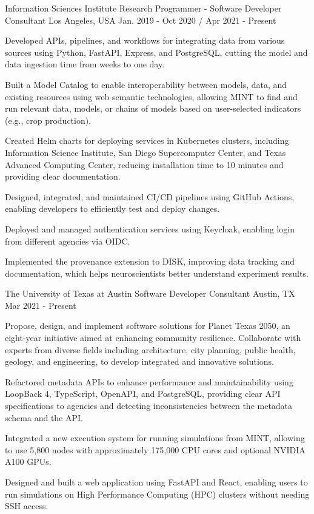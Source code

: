 \begin{cventries}

  \cventry
    {Information Sciences Institute}
    {Research Programmer - Software Developer Consultant}
    {Los Angeles, USA}
    {Jan. 2019 - Oct 2020 / Apr 2021 - Present}
    {
      \begin{cvitems}

        \item{Developed APIs, pipelines, and workflows for integrating data from various sources using Python, FastAPI, Express, and PostgreSQL, cutting the model and data ingestion time from weeks to one day.}
        \item{Built a Model Catalog to enable interoperability between models, data, and existing resources using web semantic technologies, allowing MINT to find and run relevant data, models, or chains of models based on user-selected indicators (e.g., crop production).}
        \item{Created Helm charts for deploying services in Kubernetes clusters, including Information Science Institute, San Diego Supercomputer Center, and Texas Advanced Computing Center, reducing installation time to 10 minutes and providing clear documentation.}
        \item{Designed, integrated, and maintained CI/CD pipelines using GitHub Actions, enabling developers to efficiently test and deploy changes.}
        \item{Deployed and managed authentication services using Keycloak, enabling login from different agencies via OIDC.}
        \item{Implemented the provenance extension to DISK, improving data tracking and documentation, which helps neuroscientists better understand experiment results.}
      \end{cvitems}
    }
  \cventry
    {The University of Texas at Austin}
    {Software Developer Consultant}
    {Austin, TX}
    {Mar 2021 - Present}
    {
      \begin{cvitems}
        \item{Propose, design, and implement software solutions for Planet Texas 2050, an eight-year initiative aimed at enhancing community resilience. Collaborate with experts from diverse fields including architecture, city planning, public health, geology, and engineering, to develop integrated and innovative solutions.}
        \item{Refactored metadata APIs to enhance performance and maintainability using LoopBack 4, TypeScript, OpenAPI, and PostgreSQL, providing clear API specifications to agencies and detecting inconsistencies between the metadata schema and the API.}
        \item{Integrated a new execution system for running simulations from MINT, allowing to use 5,800 nodes with approximately 175,000 CPU cores and optional NVIDIA A100 GPUs.}
        \item{Designed and built a web application using FastAPI and React, enabling users to run simulations on High Performance Computing (HPC) clusters without needing SSH access.}
      \end{cvitems}
    }



\end{cventries}
